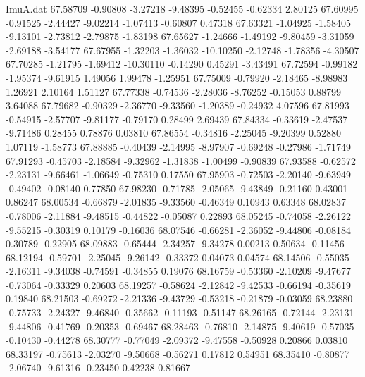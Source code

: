 \begin{filecontents}{ImuA.dat}
  67.58709   -0.90808   -3.27218   -9.48395   -0.52455   -0.62334    2.80125
  67.60995   -0.91525   -2.44427   -9.02214   -1.07413   -0.60807    0.47318
  67.63321   -1.04925   -1.58405   -9.13101   -2.73812   -2.79875   -1.83198
  67.65627   -1.24666   -1.49192   -9.80459   -3.31059   -2.69188   -3.54177
  67.67955   -1.32203   -1.36032  -10.10250   -2.12748   -1.78356   -4.30507
  67.70285   -1.21795   -1.69412  -10.30110   -0.14290    0.45291   -3.43491
  67.72594   -0.99182   -1.95374   -9.61915    1.49056    1.99478   -1.25951
  67.75009   -0.79920   -2.18465   -8.98983    1.26921    2.10164    1.51127
  67.77338   -0.74536   -2.28036   -8.76252   -0.15053    0.88799    3.64088
  67.79682   -0.90329   -2.36770   -9.33560   -1.20389   -0.24932    4.07596
  67.81993   -0.54915   -2.57707   -9.81177   -0.79170    0.28499    2.69439
  67.84334   -0.33619   -2.47537   -9.71486    0.28455    0.78876    0.03810
  67.86554   -0.34816   -2.25045   -9.20399    0.52880    1.07119   -1.58773
  67.88885   -0.40439   -2.14995   -8.97907   -0.69248   -0.27986   -1.71749
  67.91293   -0.45703   -2.18584   -9.32962   -1.31838   -1.00499   -0.90839
  67.93588   -0.62572   -2.23131   -9.66461   -1.06649   -0.75310    0.17550
  67.95903   -0.72503   -2.20140   -9.63949   -0.49402   -0.08140    0.77850
  67.98230   -0.71785   -2.05065   -9.43849   -0.21160    0.43001    0.86247
  68.00534   -0.66879   -2.01835   -9.33560   -0.46349    0.10943    0.63348
  68.02837   -0.78006   -2.11884   -9.48515   -0.44822   -0.05087    0.22893
  68.05245   -0.74058   -2.26122   -9.55215   -0.30319    0.10179   -0.16036
  68.07546   -0.66281   -2.36052   -9.44806   -0.08184    0.30789   -0.22905
  68.09883   -0.65444   -2.34257   -9.34278    0.00213    0.50634   -0.11456
  68.12194   -0.59701   -2.25045   -9.26142   -0.33372    0.04073    0.04574
  68.14506   -0.55035   -2.16311   -9.34038   -0.74591   -0.34855    0.19076
  68.16759   -0.53360   -2.10209   -9.47677   -0.73064   -0.33329    0.20603
  68.19257   -0.58624   -2.12842   -9.42533   -0.66194   -0.35619    0.19840
  68.21503   -0.69272   -2.21336   -9.43729   -0.53218   -0.21879   -0.03059
  68.23880   -0.75733   -2.24327   -9.46840   -0.35662   -0.11193   -0.51147
  68.26165   -0.72144   -2.23131   -9.44806   -0.41769   -0.20353   -0.69467
  68.28463   -0.76810   -2.14875   -9.40619   -0.57035   -0.10430   -0.44278
  68.30777   -0.77049   -2.09372   -9.47558   -0.50928    0.20866    0.03810
  68.33197   -0.75613   -2.03270   -9.50668   -0.56271    0.17812    0.54951
  68.35410   -0.80877   -2.06740   -9.61316   -0.23450    0.42238    0.81667

\end{filecontents}
